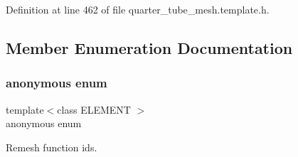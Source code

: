 Definition at line 462 of file quarter\+\_\+tube\+\_\+mesh.\+template.\+h.



\subsection{Member Enumeration Documentation}
\mbox{\label{classoomph_1_1AlgebraicRefineableQuarterTubeMesh_a0e907476508fe47206036f48848f5fc4}} 
\subsubsection{\texorpdfstring{anonymous enum}{anonymous enum}}
{\footnotesize\ttfamily template$<$class E\+L\+E\+M\+E\+NT $>$ \\
anonymous enum\hspace{0.3cm}{\ttfamily [private]}}



Remesh function ids. 


